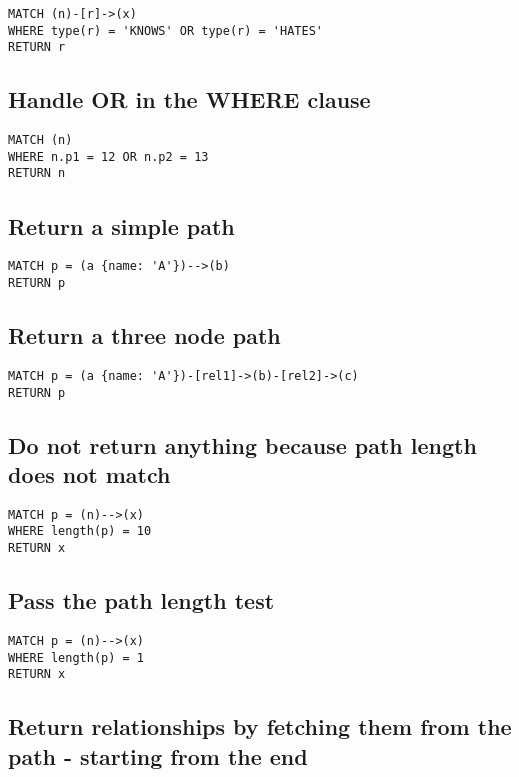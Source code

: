 \begin{lstlisting}
MATCH (n)-[r]->(x)
WHERE type(r) = 'KNOWS' OR type(r) = 'HATES'
RETURN r
\end{lstlisting}

\subsection{Handle OR in the WHERE clause}

\begin{lstlisting}
MATCH (n)
WHERE n.p1 = 12 OR n.p2 = 13
RETURN n
\end{lstlisting}

\subsection{Return a simple path}

\begin{lstlisting}
MATCH p = (a {name: 'A'})-->(b)
RETURN p
\end{lstlisting}

\subsection{Return a three node path}

\begin{lstlisting}
MATCH p = (a {name: 'A'})-[rel1]->(b)-[rel2]->(c)
RETURN p
\end{lstlisting}

\subsection{Do not return anything because path length does not match}

\begin{lstlisting}
MATCH p = (n)-->(x)
WHERE length(p) = 10
RETURN x
\end{lstlisting}

\subsection{Pass the path length test}

\begin{lstlisting}
MATCH p = (n)-->(x)
WHERE length(p) = 1
RETURN x
\end{lstlisting}

\subsection{Return relationships by fetching them from the path - starting from the end}

